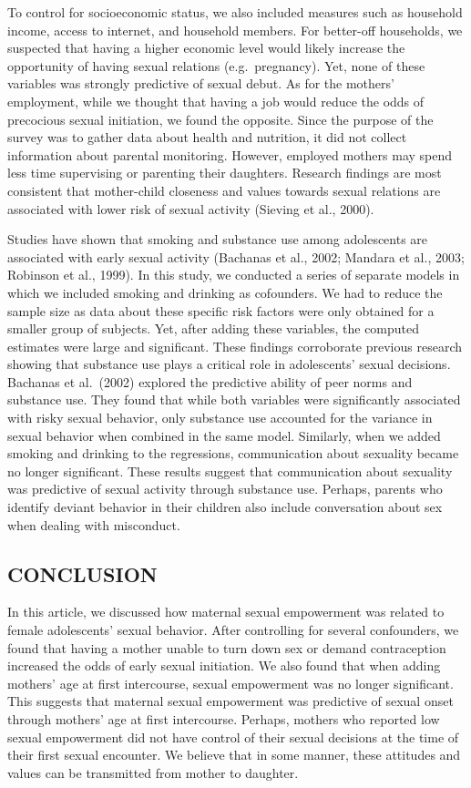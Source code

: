 \documentclass[
]{article}
\begin{document}
To control for socioeconomic status, we also included measures such as
household income, access to internet, and household members. For
better-off households, we suspected that having a higher economic level
would likely increase the opportunity of having sexual relations
(e.g.~pregnancy). Yet, none of these variables was strongly predictive
of sexual debut. As for the mothers' employment, while we thought that
having a job would reduce the odds of precocious sexual initiation, we
found the opposite. Since the purpose of the survey was to gather data
about health and nutrition, it did not collect information about
parental monitoring. However, employed mothers may spend less time
supervising or parenting their daughters. Research findings are most
consistent that mother-child closeness and values towards sexual
relations are associated with lower risk of sexual activity (Sieving et
al., 2000).

Studies have shown that smoking and substance use among adolescents are
associated with early sexual activity (Bachanas et al., 2002; Mandara et
al., 2003; Robinson et al., 1999). In this study, we conducted a series
of separate models in which we included smoking and drinking as
cofounders. We had to reduce the sample size as data about these
specific risk factors were only obtained for a smaller group of
subjects. Yet, after adding these variables, the computed estimates were
large and significant. These findings corroborate previous research
showing that substance use plays a critical role in adolescents' sexual
decisions. Bachanas et al.~(2002) explored the predictive ability of
peer norms and substance use. They found that while both variables were
significantly associated with risky sexual behavior, only substance use
accounted for the variance in sexual behavior when combined in the same
model. Similarly, when we added smoking and drinking to the regressions,
communication about sexuality became no longer significant. These
results suggest that communication about sexuality was predictive of
sexual activity through substance use. Perhaps, parents who identify
deviant behavior in their children also include conversation about sex
when dealing with misconduct.

\hypertarget{conclusion}{%
\subsection{CONCLUSION}\label{conclusion}}

In this article, we discussed how maternal sexual empowerment was
related to female adolescents' sexual behavior. After controlling for
several confounders, we found that having a mother unable to turn down
sex or demand contraception increased the odds of early sexual
initiation. We also found that when adding mothers' age at first
intercourse, sexual empowerment was no longer significant. This suggests
that maternal sexual empowerment was predictive of sexual onset through
mothers' age at first intercourse. Perhaps, mothers who reported low
sexual empowerment did not have control of their sexual decisions at the
time of their first sexual encounter. We believe that in some manner,
these attitudes and values can be transmitted from mother to daughter.
\end{document}
